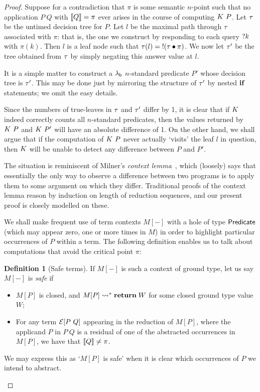 \documentclass[12pt,phd,lfcs,twoside,openright,logo,leftchapter,normalheadings]{infthesis}
\theoremstyle{plain}
\theoremstyle{definition}
\newtheorem{definition}[theorem]{Definition}
\begin{document}
\begin{proof}
  Suppose for a contradiction that $\pi$ is some semantic $n$-point
  such that no application $P~Q$ with $\llbracket Q \rrbracket =\pi$ ever arises in the
  course of computing $K~P$. Let $\tau$ be the untimed
  decision tree for $P$. Let $l$ be the maximal path through $\tau$
  associated with $\pi$: that is, the one we construct by responding
  to each query $\mathord{?} k$ with $\pi(k)$. Then $l$ is a leaf node such
  that $\tau(l) = \mathord{!} (\tau \bullet \pi)$. We now let $\tau'$ be
  the tree obtained from $\tau$ by simply negating this answer value
  at $l$.

  It is a simple matter to construct a $\lambda_{\mathsf{b}}$ $n$-standard predicate
  $P'$ whose decision tree is $\tau'$. This may be done just by
  mirroring the structure of $\tau'$ by nested $\mathbf{if}$ statements; we
  omit the easy details.

  Since the numbers of true-leaves in $\tau$ and $\tau'$ differ by
  1, it is clear that if $K$ indeed correctly counts all
  $n$-standard predicates, then the values returned by $K~P$
  and $K~P'$ will have an absolute difference of 1.  On the
  other hand, we shall argue that if the computation of $K~P$
  never actually `visits' the leaf $l$ in question, then $K$
  will be unable to detect any difference between $P$ and $P'$.

  The situation is reminiscent of Milner's \emph{context
    lemma}~\citep{Milner77}, which (loosely) says that essentially the
  only way to observe a difference between two programs is to apply
  them to some argument on which they differ.  Traditional proofs of
  the context lemma reason by induction on length of reduction
  sequences, and our present proof is closely modelled on these.

  We shall make frequent use of term contexts $M[-]$ with a hole of
  type $\mathsf{Predicate}$ (which may appear zero, one or more times in $M$)
  in order to highlight particular occurrences of $P$ within a term.
  The following definition enables us to talk about computations that
  avoid the critical point $\pi$:

  \begin{definition}[Safe terms]\label{def:safe}
  If $M[-]$ is such a context of ground type, let us say $M[-]$ is \emph{safe} if
  \begin{itemize}
    \item $M[P]$ is closed, and $M[P] \leadsto^\ast \mathbf{return}\;W$ for some closed
    ground type value $W$;
    \item For any term $\mathcal{E}[P~Q]$ appearing in the reduction of $M[P]$, where the
    applicand $P$ in $P~Q$ is a residual of one of the abstracted occurrences in $M[P]$,
    we have that $\llbracket Q \rrbracket \neq \pi$.
  \end{itemize}
  We may express this as `$M[P]$ is safe' when it is clear which occurrences of $P$
  we intend to abstract.
  \end{definition}


\end{proof}
\end{document}
